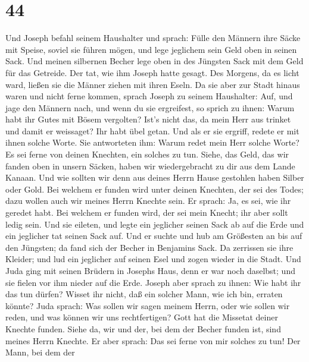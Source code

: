 \hypertarget{section-43}{%
\section{44}\label{section-43}}

 Und Joseph befahl seinem Haushalter und sprach: Fülle den
Männern ihre Säcke mit Speise, soviel sie führen mögen, und lege
jeglichem sein Geld oben in seinen Sack.  Und meinen
silbernen Becher lege oben in des Jüngsten Sack mit dem Geld für das
Getreide. Der tat, wie ihm Joseph hatte gesagt.  Des
Morgens, da es licht ward, ließen sie die Männer ziehen mit ihren Eseln.
 Da sie aber zur Stadt hinaus waren und nicht ferne kommen,
sprach Joseph zu seinem Haushalter: Auf, und jage den Männern nach, und
wenn du sie ergreifest, so sprich zu ihnen: Warum habt ihr Gutes mit
Bösem vergolten?  Ist's nicht das, da mein Herr aus trinket
und damit er weissaget? Ihr habt übel getan.  Und als er sie
ergriff, redete er mit ihnen solche Worte.  Sie antworteten
ihm: Warum redet mein Herr solche Worte? Es sei ferne von deinen
Knechten, ein solches zu tun.  Siehe, das Geld, das wir
fanden oben in unsern Säcken, haben wir wiedergebracht zu dir aus dem
Lande Kanaan. Und wie sollten wir denn aus deines Herrn Hause gestohlen
haben Silber oder Gold.  Bei welchem er funden wird unter
deinen Knechten, der sei des Todes; dazu wollen auch wir meines Herrn
Knechte sein.  Er sprach: Ja, es sei, wie ihr geredet habt.
Bei welchem er funden wird, der sei mein Knecht; ihr aber sollt ledig
sein.  Und sie eileten, und legte ein jeglicher seinen Sack
ab auf die Erde und ein jeglicher tat seinen Sack auf.  Und
er suchte und hub am Größesten an bis auf den Jüngsten; da fand sich der
Becher in Benjamins Sack.  Da zerrissen sie ihre Kleider;
und lud ein jeglicher auf seinen Esel und zogen wieder in die Stadt.
 Und Juda ging mit seinen Brüdern in Josephs Haus, denn er
war noch daselbst; und sie fielen vor ihm nieder auf die Erde.
 Joseph aber sprach zu ihnen: Wie habt ihr das tun dürfen?
Wisset ihr nicht, daß ein solcher Mann, wie ich bin, erraten könnte?
 Juda sprach: Was sollen wir sagen meinem Herrn, oder wie
sollen wir reden, und was können wir uns rechtfertigen? Gott hat die
Missetat deiner Knechte funden. Siehe da, wir und der, bei dem der
Becher funden ist, sind meines Herrn Knechte.  Er aber
sprach: Das sei ferne von mir solches zu tun! Der Mann, bei dem der

